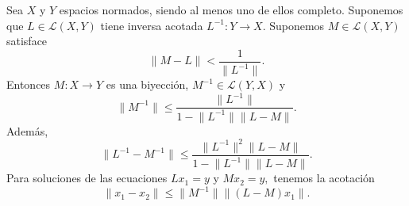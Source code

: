 \begin{teorema}
	Sea $X$ y $Y$ espacios normados, siendo al menos uno de ellos completo. Suponemos que $L \in \mathcal{L}(X,Y)$ tiene inversa acotada $L^{-1}: Y \rightarrow X.$ Suponemos $M \in \mathcal{L}(X,Y)$ satisface
	\begin{equation}\label{eq:teo7}
		\lVert M-L \rVert < \dfrac{1}{\lVert L^{-1} \rVert}.
	\end{equation}
	Entonces $M:X\rightarrow Y$ es una biyección, $M^{-1} \in \mathcal{L}(Y,X)$ y 
	\begin{equation}\label{eq:teo5}
		\lVert M^{-1} \rVert \leqslant \dfrac{\lVert L^{-1} \rVert}{1 - \lVert L^{-1} \rVert \lVert L-M \rVert}.
	\end{equation}
	Además,
	\begin{equation}\label{eq:teo4}
		\lVert L^{-1} - M^{-1} \rVert \leqslant \dfrac{\lVert L^{-1} \rVert^2 \lVert L-M \rVert}{1 - \lVert L^{-1} \rVert \lVert L-M \rVert}.
	\end{equation}
	Para soluciones de las ecuaciones $Lx_1 = y$ y $Mx_2 = y,$ tenemos la acotación
	\begin{equation}\label{eq:teo6}
		\lVert x_1 - x_2 \rVert \leqslant \lVert M^{-1} \rVert \lVert (L-M)x_1 \rVert.
	\end{equation}
\end{teorema}
